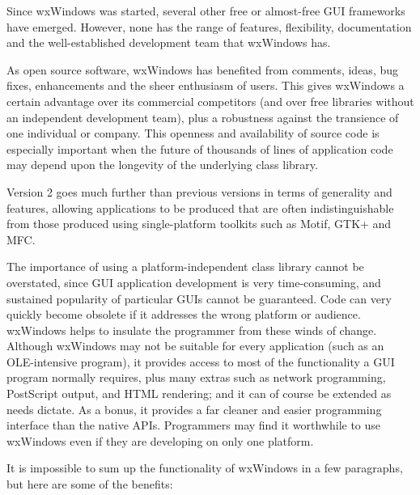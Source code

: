 Since wxWindows was started, several other free or almost-free
GUI frameworks have emerged. However, none has the range of
features, flexibility, documentation and the well-established
development team that wxWindows has.

As open source software, wxWindows has benefited from comments,
ideas, bug fixes, enhancements and the sheer enthusiasm of
users. This gives wxWindows a certain advantage over its
commercial competitors (and over free libraries without an
independent development team), plus a robustness against the
transience of one individual or company. This openness and
availability of source code is especially important when the
future of thousands of lines of application code may depend upon
the longevity of the underlying class library.

Version 2 goes much further than previous versions in terms of
generality and features, allowing applications to be produced
that are often indistinguishable from those produced using
single-platform toolkits such as Motif, GTK+ and MFC.

The importance of using a platform-independent class library
cannot be overstated, since GUI application development is very
time-consuming, and sustained popularity of particular GUIs
cannot be guaranteed. Code can very quickly become obsolete if
it addresses the wrong platform or audience.  wxWindows helps to
insulate the programmer from these winds of change. Although
wxWindows may not be suitable for every application (such as an
OLE-intensive program), it provides access to most of the
functionality a GUI program normally requires, plus many extras
such as network programming, PostScript output, and HTML
rendering; and it can of course be extended as needs dictate.
As a bonus, it provides a far cleaner and easier programming
interface than the native APIs. Programmers may find it
worthwhile to use wxWindows even if they are developing on only
one platform.

It is impossible to sum up the functionality of wxWindows in a few paragraphs, but
here are some of the benefits:

